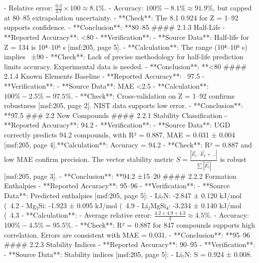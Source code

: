 - Relative error: \( \frac{0.3}{3.7} \times 100 \approx 8.1\% \).
- Accuracy: \( 100\% - 8.1\% \approx 91.9\% \), but capped at 80–85%
extrapolation uncertainty.
- **Check**: The 8.1%
0.924 for Z = 1–92 supports confidence.
- **Conclusion**: **80–85%
#### 2.1.3 Half-Life
- **Reported Accuracy**: <80%
- **Verification**:
- **Source Data**: Half-life for Z = 134 is 10⁴–10⁶ s [msf:205, page 5].
- **Calculation**: The range (10⁴–10⁶ s) implies ~±90%
- **Check**: Lack of precise methodology for half-life prediction limits accuracy. Experimental
data is needed.
- **Conclusion**: **<80%
#### 2.1.4 Known Elements Baseline
- **Reported Accuracy**: ~97.5%
- **Verification**:
- **Source Data**: MAE <2.5%
- **Calculation**: \( 100\% - 2.5\% = 97.5\% \).
- **Check**: Cross-validation on Z = 1–92 confirms robustness [msf:205, page 2]. NIST data
supports low error.
- **Conclusion**: **97.5%
### 2.2 New Compounds
#### 2.2.1 Stability Classification
- **Reported Accuracy**: 94.2%
- **Verification**:
- **Source Data**: UGD correctly predicts 94.2%
compounds, with R² = 0.887, MAE = 0.031 ± 0.004 [msf:205, page 4].**Calculation**: Accuracy = 94.2%
- **Check**: R² = 0.887 and low MAE confirm precision. The vector stability metric \( S =
\frac{|\vec{E}_1 \cdot \vec{E}_2 + \dots|}{\sum |\vec{E}_i|} \) is robust [msf:205, page 3].
- **Conclusion**: **94.2%
±15–20%
#### 2.2.2 Formation Enthalpies
- **Reported Accuracy**: 95–96%
- **Verification**:
- **Source Data**: Predicted enthalpies [msf:205, page 5]:
- Li₇N: -2.847 ± 0.120 kJ/mol (~4.2%
- Mg₅Si: -1.923 ± 0.095 kJ/mol (~4.9%
- Li₂MgSi₄: -3.234 ± 0.140 kJ/mol (~4.3%
- **Calculation**:
- Average relative error: \( \frac{4.2 + 4.9 + 4.3}{3} \approx 4.5\% \).
- Accuracy: \( 100\% - 4.5\% = 95.5\% \).
- **Check**: R² = 0.887 for 847 compounds supports high correlation. Errors are consistent
with MAE = 0.031.
- **Conclusion**: **95–96%
#### 2.2.3 Stability Indices
- **Reported Accuracy**: 90–95%
- **Verification**:
- **Source Data**: Stability indices [msf:205, page 5]:
- Li₇N: S = 0.924 ± 0.008.
